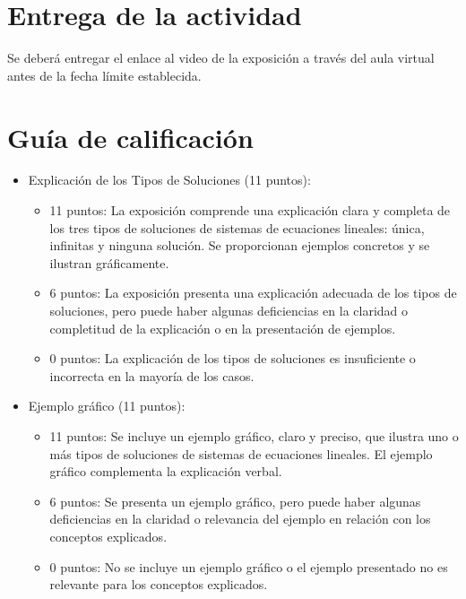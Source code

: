 \documentclass[a4,11pt]{aleph-notas}
\begin{document}
\section{Entrega de la actividad}

Se deberá entregar el enlace al video de la exposición a través del aula virtual antes de la fecha límite establecida.


\section{Guía de calificación}

\begin{itemize}
\item
    Explicación de los Tipos de Soluciones (11 puntos):
    \begin{itemize}
        \item 11 puntos: La exposición comprende una explicación clara y completa de los tres tipos de soluciones de sistemas de ecuaciones lineales: única, infinitas y ninguna solución. Se proporcionan ejemplos concretos y se ilustran gráficamente.
        \item 6 puntos: La exposición presenta una explicación adecuada de los tipos de soluciones, pero puede haber algunas deficiencias en la claridad o completitud de la explicación o en la presentación de ejemplos.
        \item 0 puntos: La explicación de los tipos de soluciones es insuficiente o incorrecta en la mayoría de los casos.
    \end{itemize}

\item
    Ejemplo gráfico (11 puntos):
    \begin{itemize}
        \item 11 puntos: Se incluye un ejemplo gráfico, claro y preciso, que ilustra uno o más tipos de soluciones de sistemas de ecuaciones lineales. El ejemplo gráfico complementa la explicación verbal.
        \item 6 puntos: Se presenta un ejemplo gráfico, pero puede haber algunas deficiencias en la claridad o relevancia del ejemplo en relación con los conceptos explicados.
        \item 0 puntos: No se incluye un ejemplo gráfico o el ejemplo presentado no es relevante para los conceptos explicados.
    \end{itemize}


\end{itemize}
\end{document}
